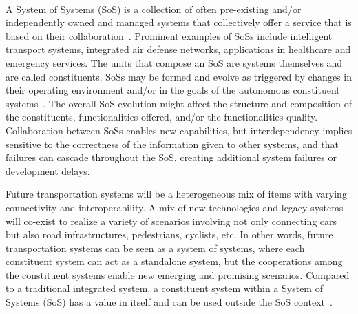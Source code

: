 \documentclass{llncs}
\begin{document}






\maketitle              %

%

~\\

A System of Systems (SoS) is a collection of often pre-existing and/or independently owned and managed systems that collectively offer a service that is based on their collaboration~\cite{SoSInnovation,Fitzgerald2014,SoS}. Prominent examples of SoSs include intelligent transport systems, integrated air defense networks, applications in healthcare and emergency services. The units that compose an SoS are systems themselves and are called constituents. SoSs may be formed and evolve as triggered by changes in their operating environment and/or in the goals of the autonomous constituent systems~\cite{Fitzgerald2014,MeaningOfOf}. The overall SoS evolution might affect the structure and composition of the constituents, functionalities offered, and/or the functionalities quality. Collaboration between SoSs enables new capabilities, but interdependency implies sensitive to the correctness of the information given to other systems, and that failures can cascade throughout the SoS, creating additional system failures or development delays.

Future transportation systems will be a heterogeneous mix of items with varying connectivity and interoperability. A mix of new technologies and legacy systems will co-exist to realize a variety of scenarios involving not only connecting cars but also road infrastructures, pedestrians, cyclists, etc. In other words, future transportation systems can be seen as a system of systems, where each constituent system can act as a standalone system, but the cooperations among the constituent systems enable new emerging and promising scenarios. Compared to a traditional integrated system, a constituent system within a System of Systems (SoS) has a value in itself and can be used outside the SoS context~\cite{Jakob}.
\end{document}
